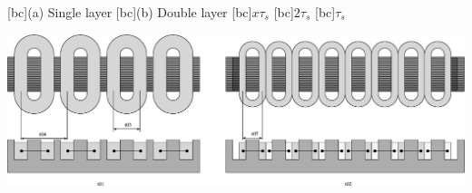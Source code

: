 \begin{psfrags}%
\psfragscanon

[bc]{(a) Single layer}
[bc]{(b) Double layer}
[bc]{$x \tau_s$}
[bc]{$2\tau_s$}
[bc]{$\tau_s$}

\includegraphics[width=1.00\textwidth]{figs/f_concen_coils.eps}
\end{psfrags}%
